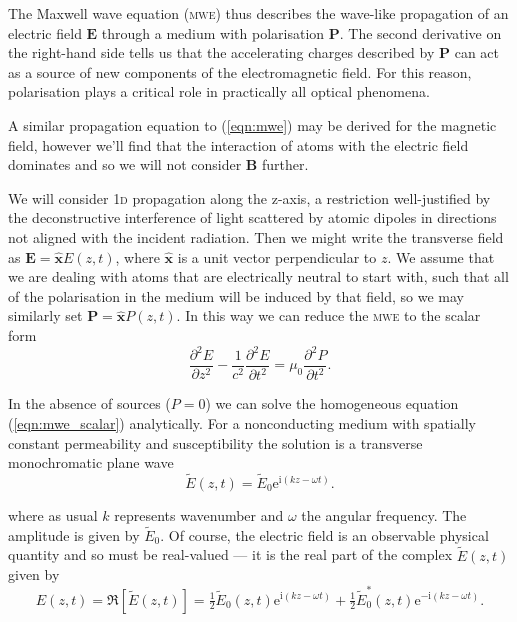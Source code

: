     The Maxwell wave equation (\textsc{mwe}) thus describes the wave-like
    propagation of an electric field $\mathbf{E}$ through a medium with
    polarisation $\mathbf{P}$. The second derivative on the right-hand side
    tells us that the accelerating charges described by $\mathbf{P}$ can act as
    a source of new components of the electromagnetic field. For this reason,
    polarisation plays a critical role in practically all optical
    phenomena.\cite{boyd2008nonlinear}

    A similar propagation equation to (\ref{eqn:mwe}) may be derived for the
    magnetic field, however we'll find that the interaction of atoms with the
    electric field dominates and so we will not consider $\mathbf{B}$ further.

    We will consider \textsc{1d} propagation along the z-axis, a restriction
    well-justified by the deconstructive interference of light scattered by
    atomic dipoles in directions not aligned with the incident
    radiation\cite{hecht2015optics}. Then we might write the transverse field as
    $\mathbf{E} = \hat{\mathbf{x}} E(z, t)$, where $\hat{\mathbf{x}}$ is a unit
    vector perpendicular to $z$. We assume that we are dealing with atoms that
    are electrically neutral to start with, such that all of the polarisation in
    the medium will be induced by that field, so we may similarly set
    $\mathbf{P} = \hat{\mathbf{x}} P(z, t)$. In this way we can reduce the
    \textsc{mwe} to the scalar form
    \begin{equation}
      \frac{\partial^2 E}{\partial z^2} - \frac{1}{c^2} \frac{\partial^2
        E}{\partial t^2} =    \mu_0 \frac{\partial^2 P}{\partial t^2}.
      \label{eqn:mwe_scalar} 
    \end{equation}

    In the absence of sources (\ie $P = 0$) we can solve the homogeneous
    equation (\ref{eqn:mwe_scalar}) analytically. For a nonconducting medium
    with spatially constant permeability and susceptibility the solution is a
    transverse monochromatic plane wave\cite{jackson1998classical}
    \begin{equation}
      \tilde{E}(z,t) = \tilde{E}_0 \mathrm{e}^{\mathrm{i}(k z - \omega t)}.
      \label{eqn:plane_waves}
    \end{equation}

    where as usual $k$ represents wavenumber and $\omega$ the angular frequency.
    The amplitude is given by $\tilde{E}_0$. Of course, the electric field is an
    observable physical quantity and so must be real-valued --- it is the real
    part of the complex $\tilde{E}(z,t)$ given by
    \begin{equation}
      E(z,t) = \Re[\tilde{E}(z,t)] = \tfrac{1}{2} \tilde{E}_0(z,t) 
                    \mathrm{e}^{\mathrm{i}(k z - \omega t)} 
                + \tfrac{1}{2} \tilde{E}_0^*(z,t) 
                    \mathrm{e}^{-\mathrm{i}(k z - \omega t)}.
    \end{equation}

